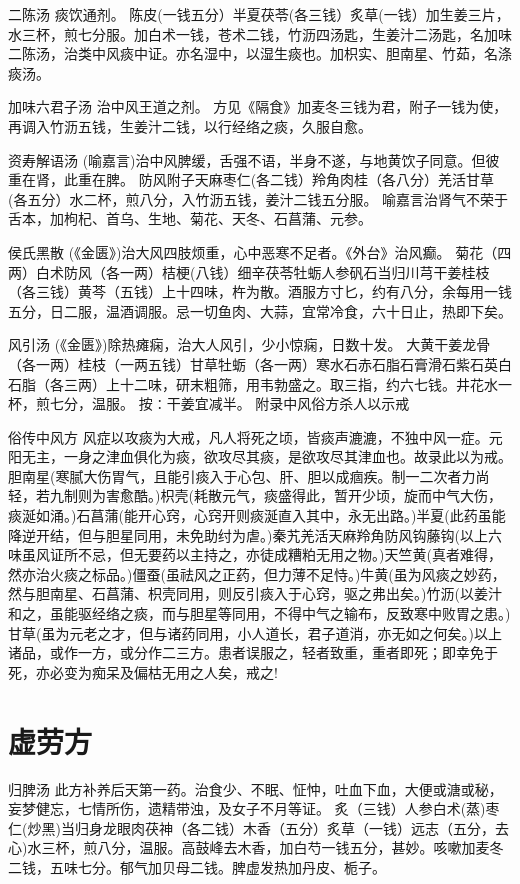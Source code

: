 \documentclass[a4paper,12pt,UTF8,twoside]{ctexbook}
\begin{document}
    二陈汤
    痰饮通剂。
    陈皮(一钱五分）半夏茯苓(各三钱）炙草(一钱）加生姜三片，水三杯，煎七分服。加白术一钱，苍术二钱，竹沥四汤匙，生姜汁二汤匙，名加味二陈汤，治类中风痰中证。亦名湿中，以湿生痰也。加枳实、胆南星、竹茹，名涤痰汤。
    
    加味六君子汤
    治中风王道之剂。
    方见《隔食》加麦冬三钱为君，附子一钱为使，再调入竹沥五钱，生姜汁二钱，以行经络之痰，久服自愈。
    
    资寿解语汤
    (喻嘉言)治中风脾缓，舌强不语，半身不遂，与地黄饮子同意。但彼重在肾，此重在脾。
    防风附子天麻枣仁(各二钱）羚角肉桂（各八分）羌活甘草(各五分）水二杯，煎八分，入竹沥五钱，姜汁二钱五分服。
    喻嘉言治肾气不荣于舌本，加枸杞、首乌、生地、菊花、天冬、石菖蒲、元参。
    
    侯氏黑散
    (《金匮》)治大风四肢烦重，心中恶寒不足者。《外台》治风癫。
    菊花（四两）白术防风（各一两）桔梗(八钱）细辛茯苓牡蛎人参矾石当归川芎干姜桂枝（各三钱）黄芩（五钱）上十四味，杵为散。酒服方寸匕，约有八分，余每用一钱五分，日二服，温酒调服。忌一切鱼肉、大蒜，宜常冷食，六十日止，热即下矣。
    
    风引汤
    (《金匮》)除热瘫痫，治大人风引，少小惊痫，日数十发。
    大黄干姜龙骨（各一两）桂枝（一两五钱）甘草牡蛎（各一两）寒水石赤石脂石膏滑石紫石英白石脂（各三两）上十二味，研末粗筛，用韦勃盛之。取三指，约六七钱。井花水一杯，煎七分，温服。
    按∶干姜宜减半。
     附录中风俗方杀人以示戒	
    
    俗传中风方
    风症以攻痰为大戒，凡人将死之顷，皆痰声漉漉，不独中风一症。元阳无主，一身之津血俱化为痰，欲攻尽其痰，是欲攻尽其津血也。故录此以为戒。
    胆南星(寒腻大伤胃气，且能引痰入于心包、肝、胆以成痼疾。制一二次者力尚轻，若九制则为害愈酷。)枳壳(耗散元气，痰盛得此，暂开少顷，旋而中气大伤，痰涎如涌。)石菖蒲(能开心窍，心窍开则痰涎直入其中，永无出路。)半夏(此药虽能降逆开结，但与胆星同用，未免助纣为虐。)秦艽羌活天麻羚角防风钩藤钩(以上六味虽风证所不忌，但无要药以主持之，亦徒成糟粕无用之物。)天竺黄(真者难得，然亦治火痰之标品。)僵蚕(虽祛风之正药，但力薄不足恃。)牛黄(虽为风痰之妙药，然与胆南星、石菖蒲、枳壳同用，则反引痰入于心窍，驱之弗出矣。)竹沥(以姜汁和之，虽能驱经络之痰，而与胆星等同用，不得中气之输布，反致寒中败胃之患。)甘草(虽为元老之才，但与诸药同用，小人道长，君子道消，亦无如之何矣。)以上诸品，或作一方，或分作二三方。患者误服之，轻者致重，重者即死；即幸免于死，亦必变为痴呆及偏枯无用之人矣，戒之! 
    
    \section{虚劳方}
    归脾汤
    此方补养后天第一药。治食少、不眠、怔忡，吐血下血，大便或溏或秘，妄梦健忘，七情所伤，遗精带浊，及女子不月等证。
    炙（三钱）人参白术(蒸)枣仁(炒黑)当归身龙眼肉茯神（各二钱）木香（五分）炙草（一钱）远志（五分，去心)水三杯，煎八分，温服。高鼓峰去木香，加白芍一钱五分，甚妙。咳嗽加麦冬二钱，五味七分。郁气加贝母二钱。脾虚发热加丹皮、栀子。
    
\end{document}
